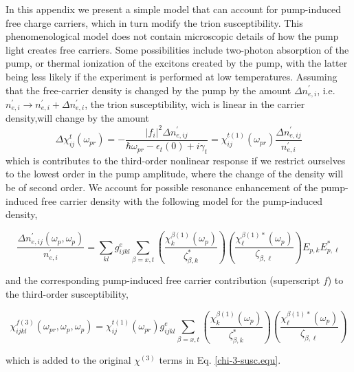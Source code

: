 \documentclass[aps,prb,superscriptaddress,letterpaper,amsmath,amssymb,twocolumn,preprintnumbers]{revtex4}
\begin{document}
\label{Sec:appendix-free-carriers}



In this appendix we present a simple model that can account for pump-induced
free charge carriers, which in turn modify the trion susceptibility. This
phenomenological model does not contain microscopic details of how the pump
light creates free carriers. Some possibilities include two-photon absorption
of the pump, or thermal ionization of the excitons created by the pump, with
the latter being less likely if the experiment is performed at low
temperatures. Assuming that the free-carrier density is changed by the pump by
the amount $\Delta n_{e,i}^{\prime}$, i.e. $n_{e,i}^{\prime}\rightarrow
n_{e,i}^{\prime}+\Delta n_{e,i}^{\prime}$, the trion susceptibility, wich is
linear in the carrier density,will change by the amount%
\begin{equation}
\Delta\chi_{ij}^{t}(\omega_{pr})=-\frac{|f_{i}|^{2}\Delta n_{e,ij}^{\prime}%
}{\hbar\omega_{pr}-\epsilon_{t}(0)+i\gamma_{t}}=\chi_{ij}^{t(1)}(\omega
_{pr})\frac{\Delta n_{e,ij}^{\prime}}{n_{e,i}^{\prime}}%
\label{eq:del-chi-trion}%
\end{equation}
which is contributes to the third-order nonlinear response if we
restrict ourselves to the lowest order in the pump amplitude, where the change
of the density will be of second order. We account for possible resonance
enhancement of the pump-induced free carrier density with the following model
for the pump-induced density,%
\begin{widetext}
\begin{equation}
\frac{\Delta n_{e,ij}^{\prime}(\omega_{p},\omega_{p})}{n_{e,i}^{\prime}}%
=\sum_{kl}g_{ijkl}^{e}\sum_{\beta=x,t}\left(  \frac{\chi_{k}^{\beta(1)}%
(\omega_{p})}{\zeta_{\beta,k}^{\ast}}\right)  \left(  \frac{\chi_{\ell}%
^{\beta(1) \ast}(\omega_{p})}{\zeta_{\beta,\ell}}\right)  E_{p,k}^{{}%
}E_{p,\ell}^{\ast} \label{eq:del-n-over-n-trion}%
\end{equation}
\end{widetext}
and the corresponding pump-induced free carrier contribution (superscript $f$)
 to the third-order susceptibility,%
\begin{widetext}
\begin{equation}
\chi_{ijkl}^{f(3)}(\omega_{pr},\omega_{p},\omega_{p})=\chi_{ij}^{t(1)}%
(\omega_{pr})g_{ijkl}^{e}\sum_{\beta=x,t}\left(  \frac{\chi_{k}^{\beta
(1)}(\omega_{p})}{\zeta_{\beta,k}^{\ast}}\right)  \left(  \frac{\chi_{\ell
}^{\beta(1) \ast}(\omega_{p})}{\zeta_{\beta,\ell}}\right)
\end{equation}
\end{widetext}
which is added to the original $\chi^{(3)}$ terms in Eq. \ref{chi-3-susc.equ}.
\end{document}
